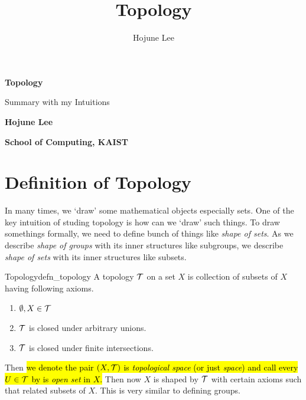 \documentclass[12pt, a4paper, twoside]{article}
\author{Hojune Lee}
\title{Topology}
\newcommand{\intn}[1]{\left( {#1} \right)}
\theoremstyle{plain}
\begin{document}
\begin{titlepage}
    \begin{center}
        \vspace*{9cm}
            
        \Huge
        \textbf{Topology}
    
        \vspace{1cm}
        \large
        Summary with my Intuitions
        \vspace{3cm}
        
        \LARGE
        \textbf{Hojune Lee}
            
        \vspace{8cm}
            
        \normalsize
        \textbf{School of Computing, KAIST}\\  
    \end{center}
\end{titlepage}

\hypersetup{linkcolor=black}
\tableofcontents
\hypersetup{linkcolor=blue}

\newpage 

\section{Definition of Topology}

In many times, we \lq draw' some mathematical objects especially sets. One of the key intuition of studing topology is how can we \lq draw' such things. 
To draw somethings formally, we need to define bunch of things like \textit{shape of sets}. 
As we describe \textit{shape of groups} with its inner structures like subgroups, we describe \textit{shape of sets} with its inner structures like subsets. 

\begin{defn}{Topology}{defn_topology}
    A topology ${\mathcal {T}}$ on a set $X$ is collection of subsets of $X$ having following axioms. 
    \begin{enumerate}
        \item $\emptyset, X \in {\mathcal {T}}$
        \item ${\mathcal {T}}$ is closed under arbitrary unions. 
        \item ${\mathcal {T}}$ is closed under finite intersections. 
    \end{enumerate}
\end{defn}

Then \hl{we denote the pair $\intn{X, \CT}$ is \textit{topological space} (or just \textit{space}) and call every $U \in {\mathcal {T}}$ by is \textit{open set} in $X$.} 
Then now $X$ is shaped by ${\mathcal {T}}$ with certain axioms such that related subsets of $X$. This is very similar to defining groups. 
\end{document}
